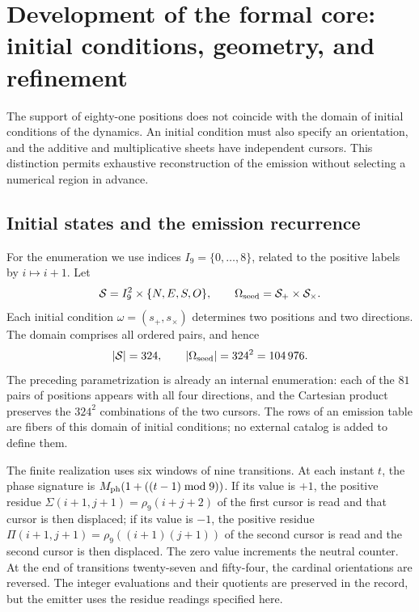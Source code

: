 \section{Development of the formal core: initial conditions, geometry, and refinement}
\label{sec:extension}

The support of eighty-one positions does not coincide with the domain of initial conditions of the dynamics. An initial condition must also specify an orientation, and the additive and multiplicative sheets have independent cursors. This distinction permits exhaustive reconstruction of the emission without selecting a numerical region in advance.

\subsection{Initial states and the emission recurrence}

For the enumeration we use indices \(I_9=\{0,\ldots,8\}\), related to the positive labels by \(i\mapsto i+1\). Let
\[
 \mathcal S=I_9^2\times\{N,E,S,O\},\qquad
 \Omega_{\rm seed}=\mathcal S_+\times\mathcal S_\times.
\]
Each initial condition \(\omega=(s_+,s_\times)\) determines two positions and two directions. The domain comprises all ordered pairs, and hence
\begin{equation}
 |\mathcal S|=324,\qquad |\Omega_{\rm seed}|=324^2=104\,976.
 \label{eq:semillas}
\end{equation}
The preceding parametrization is already an internal enumeration: each of the
\(81\) pairs of positions appears with all four directions, and the Cartesian
product preserves the \(324^2\) combinations of the two cursors. The rows
of an emission table are fibers of this domain of initial conditions;
no external catalog is added to define them.

The finite realization uses six windows of nine transitions. At each instant \(t\), the phase signature is \(M_{\rm ph}(1+((t-1)\bmod9))\). If its value is \(+1\), the positive residue \(\Sigma(i+1,j+1)=\rho_9(i+j+2)\) of the first cursor is read and that cursor is then displaced; if its value is \(-1\), the positive residue \(\Pi(i+1,j+1)=\rho_9((i+1)(j+1))\) of the second cursor is read and the second cursor is then displaced. The zero value increments the neutral counter. At the end of transitions twenty-seven and fifty-four, the cardinal orientations are reversed. The integer evaluations and their quotients are preserved in the record, but the emitter uses the residue readings specified here.


